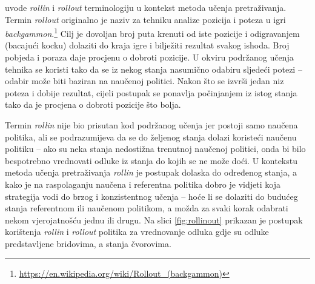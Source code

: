 \citet*{daume15lols} uvode \textit{rollin} i \textit{rollout} terminologiju u
kontekst metoda učenja pretraživanja. Termin \textit{rollout} originalno je
naziv za tehniku analize pozicija i poteza u igri
\textit{backgammon}.\footnote{\url{https://en.wikipedia.org/wiki/Rollout_(backgammon)}}
Cilj je dovoljan broj puta krenuti od iste pozicije i odigravanjem (bacajući
kocku) dolaziti do kraja igre i bilježiti rezultat svakog ishoda. Broj pobjeda i
poraza daje procjenu o dobroti pozicije. U okviru podržanog učenja tehnika se
koristi tako da se iz nekog stanja nasumično odabiru sljedeći potezi -- odabir
može biti baziran na naučenoj politici. Nakon što se izvrši jedan niz poteza i
dobije rezultat, cijeli postupak se ponavlja počinjanjem iz istog stanja tako da
je procjena o dobroti pozicije što bolja.

Termin \textit{rollin} nije bio prisutan kod podržanog učenja jer postoji samo
naučena politika, ali se podrazumijeva da se do željenog stanja dolazi koristeći
naučenu politiku -- ako su neka stanja nedostižna trenutnoj naučenoj politici, onda
bi bilo bespotrebno vrednovati odluke iz stanja do kojih se ne može doći. U
kontekstu metoda učenja pretraživanja \textit{rollin} je postupak dolaska do
određenog stanja, a kako je na raspolaganju naučena i referentna politika dobro je
vidjeti koja strategija vodi do brzog i konzistentnog učenja -- hoće li se
dolaziti do budućeg stanja referentnom ili naučenom politikom, a možda za svaki
korak odabrati nekom vjerojatnošću jednu ili drugu. Na slici \ref{fig:rollinout}
prikazan je postupak korištenja \textit{rollin} i \textit{rollout} politika za
vrednovanje odluka gdje su odluke predstavljene bridovima, a stanja čvorovima.

